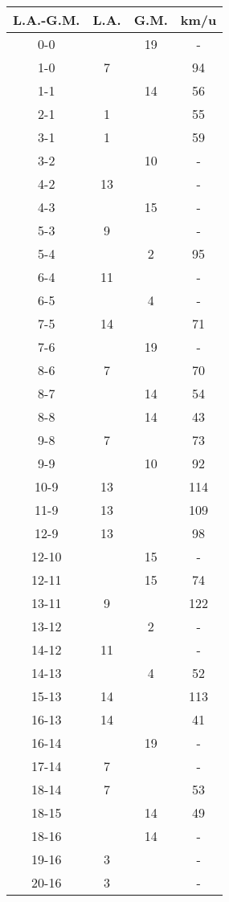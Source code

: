 \begin{table}[ht!]
  \centering
  \scriptsize
  \begin{tabular}{|c|c|c|c|} \hline
    L.A.-G.M. & L.A. & G.M. & km/u \\ \hline
    0-0 &  & 19 & - \\
    1-0 & 7 & & 94 \\
    1-1 &  & 14 & 56 \\
    2-1 & 1 & & 55 \\
    3-1 & 1 & & 59 \\
    3-2 &  & 10 & - \\
    4-2 & 13 & & - \\
    4-3 &  & 15 & - \\
    5-3 & 9 & & - \\
    5-4 &  & 2 & 95 \\
    6-4 & 11 & & - \\
    6-5 &  & 4 & - \\
    7-5 & 14 & & 71 \\
    7-6 &  & 19 & - \\
    8-6 & 7 &  & 70 \\
    8-7 &  & 14 & 54 \\
    8-8 &  & 14 & 43 \\
    9-8 & 7 & & 73 \\
    9-9 &  & 10 & 92 \\
    10-9 & 13 & & 114 \\
    11-9 & 13 & & 109 \\
    12-9 & 13 & & 98 \\
    12-10 &  & 15 & - \\
    12-11 &  & 15 & 74 \\
    13-11 & 9 &  & 122 \\
    13-12 &  & 2 & - \\
    14-12 & 11 &  & - \\
    14-13 &  & 4 & 52 \\
    15-13 & 14 &  & 113 \\
    16-13 & 14 &  & 41 \\
    16-14 &  & 19 & - \\
    17-14 & 7 &  & - \\
    18-14 & 7 &  & 53 \\
    18-15 &  & 14 & 49 \\
    18-16 &  & 14 & - \\
    19-16 & 3 &  & - \\
    20-16 & 3 &  & - \\

\end{tabular}
\end{table}
